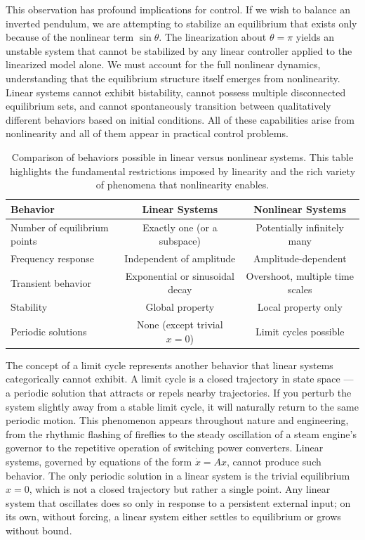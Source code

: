 This observation has profound implications for control. If we wish to balance an inverted pendulum, we are attempting to stabilize an equilibrium that exists only because of the nonlinear term $\sin\theta$. The linearization about $\theta = \pi$ yields an unstable system that cannot be stabilized by any linear controller applied to the linearized model alone. We must account for the full nonlinear dynamics, understanding that the equilibrium structure itself emerges from nonlinearity. Linear systems cannot exhibit bistability, cannot possess multiple disconnected equilibrium sets, and cannot spontaneously transition between qualitatively different behaviors based on initial conditions. All of these capabilities arise from nonlinearity and all of them appear in practical control problems.

\begin{table}[htbp]
\centering
\begin{tabular}{|l|c|c|}
\hline
\textbf{Behavior} & \textbf{Linear Systems} & \textbf{Nonlinear Systems} \\
\hline
Number of equilibrium points & Exactly one (or a subspace) & Potentially infinitely many \\
\hline
Frequency response & Independent of amplitude & Amplitude-dependent \\
\hline
Transient behavior & Exponential or sinusoidal decay & Overshoot, multiple time scales \\
\hline
Stability & Global property & Local property only \\
\hline
Periodic solutions & None (except trivial $x=0$) & Limit cycles possible \\
\hline
\end{tabular}
\caption{Comparison of behaviors possible in linear versus nonlinear systems. This table highlights the fundamental restrictions imposed by linearity and the rich variety of phenomena that nonlinearity enables.}
\end{table}

The concept of a limit cycle represents another behavior that linear systems categorically cannot exhibit. A limit cycle is a closed trajectory in state space --- a periodic solution that attracts or repels nearby trajectories. If you perturb the system slightly away from a stable limit cycle, it will naturally return to the same periodic motion. This phenomenon appears throughout nature and engineering, from the rhythmic flashing of fireflies to the steady oscillation of a steam engine's governor to the repetitive operation of switching power converters. Linear systems, governed by equations of the form $\dot{x} = Ax$, cannot produce such behavior. The only periodic solution in a linear system is the trivial equilibrium $x = 0$, which is not a closed trajectory but rather a single point. Any linear system that oscillates does so only in response to a persistent external input; on its own, without forcing, a linear system either settles to equilibrium or grows without bound.

